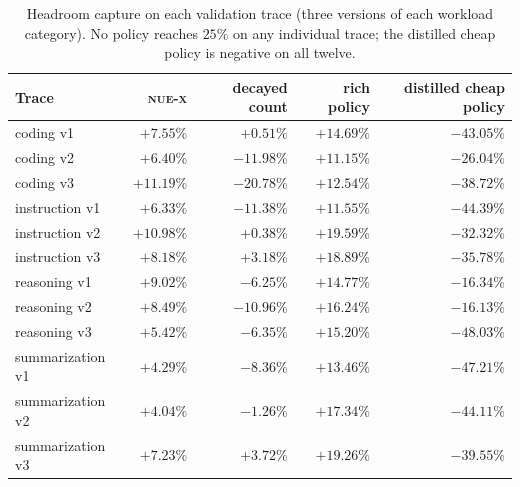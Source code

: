 \begin{table}[H]
\centering
\caption{Headroom capture on each validation trace (three versions of each workload category). No policy reaches $25\%$ on any individual trace; the distilled cheap policy is negative on all twelve.}
\label{tab:valtr}
\small
\begin{tabular}{lrrrr}
\toprule
Trace & \textsc{nue-x} & decayed count & rich policy & distilled cheap policy \\
\midrule
coding v1 & $+7.55\%$ & $+0.51\%$ & $+14.69\%$ & $-43.05\%$ \\
coding v2 & $+6.40\%$ & $-11.98\%$ & $+11.15\%$ & $-26.04\%$ \\
coding v3 & $+11.19\%$ & $-20.78\%$ & $+12.54\%$ & $-38.72\%$ \\
instruction v1 & $+6.33\%$ & $-11.38\%$ & $+11.55\%$ & $-44.39\%$ \\
instruction v2 & $+10.98\%$ & $+0.38\%$ & $+19.59\%$ & $-32.32\%$ \\
instruction v3 & $+8.18\%$ & $+3.18\%$ & $+18.89\%$ & $-35.78\%$ \\
reasoning v1 & $+9.02\%$ & $-6.25\%$ & $+14.77\%$ & $-16.34\%$ \\
reasoning v2 & $+8.49\%$ & $-10.96\%$ & $+16.24\%$ & $-16.13\%$ \\
reasoning v3 & $+5.42\%$ & $-6.35\%$ & $+15.20\%$ & $-48.03\%$ \\
summarization v1 & $+4.29\%$ & $-8.36\%$ & $+13.46\%$ & $-47.21\%$ \\
summarization v2 & $+4.04\%$ & $-1.26\%$ & $+17.34\%$ & $-44.11\%$ \\
summarization v3 & $+7.23\%$ & $+3.72\%$ & $+19.26\%$ & $-39.55\%$ \\
\bottomrule
\end{tabular}
\end{table}
